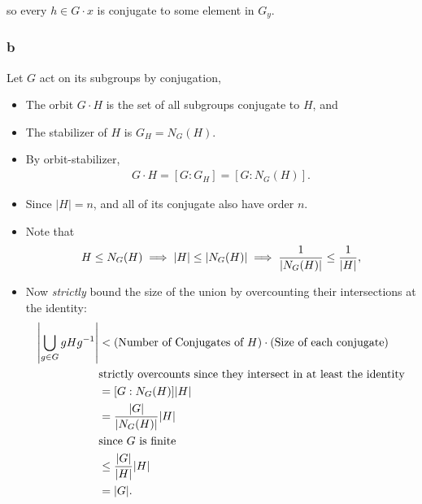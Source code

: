 \begin{solution}
so every \(h\in G\cdot x\) is conjugate to some element in \(G_y\).

\hypertarget{b-18}{%
\subsubsection{b}\label{b-18}}

Let \(G\) act on its subgroups by conjugation,

\begin{itemize}
\item
  The orbit \(G\cdot H\) is the set of all subgroups conjugate to \(H\),
  and
\item
  The stabilizer of \(H\) is \(G_H = N_G(H)\).
\item
  By orbit-stabilizer,
  \begin{align*}
  G\cdot H = [G: G_H] = [G: N_G(H)]
  .\end{align*}
\item
  Since \({\left\lvert {H} \right\rvert} = n\), and all of its conjugate
  also have order \(n\).
\item
  Note that
  \begin{align*}
  H\leq N_G(H) \implies {\left\lvert {H} \right\rvert} \leq {\left\lvert {N_G(H)} \right\rvert} \implies {1\over {\left\lvert {N_G(H)} \right\rvert}} \leq {1\over {\left\lvert {H} \right\rvert}}
  ,\end{align*}
\item
  Now \emph{strictly} bound the size of the union by overcounting their
  intersections at the identity:
  \begin{align*}
  {\left\lvert {\bigcup_{g\in G}gHg^{-1}} \right\rvert} 
  &< (\text{Number of Conjugates of } H) \cdot (\text{Size of each conjugate}) \\ 
  & \text{strictly overcounts since they intersect in at least the identity} \\
  &= [G: N_G(H)] {\left\lvert {H} \right\rvert} \\
  &= {{\left\lvert {G} \right\rvert} \over {\left\lvert {N_G(H)} \right\rvert}} {\left\lvert {H} \right\rvert} \\
  & \text{since $G$ is finite} \\
  &\leq {{\left\lvert {G} \right\rvert} \over {\left\lvert {H} \right\rvert}} {\left\lvert {H} \right\rvert} \\
  &= {\left\lvert {G} \right\rvert}
  .\end{align*}
\end{itemize}


\end{solution}
